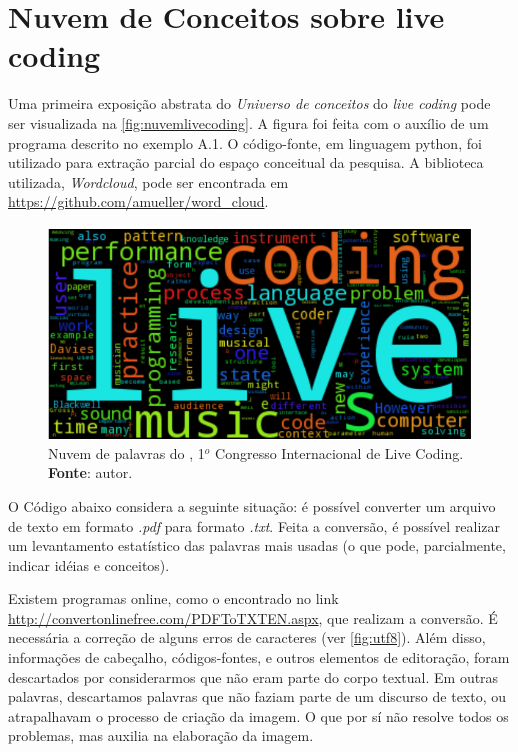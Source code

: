 \chapter{Nuvem de Conceitos sobre live coding}\label{app:A}

Uma primeira exposição abstrata do \emph{Universo de conceitos} do \emph{live coding} pode ser visualizada na \autoref{fig:nuvemlivecoding}. A figura foi feita com o auxílio de um programa descrito no exemplo A.1. O código-fonte, em linguagem python, foi utilizado para extração parcial do espaço conceitual da pesquisa. A biblioteca utilizada, \emph{Wordcloud}, pode ser encontrada em \url{https://github.com/amueller/word_cloud}. 

\begin{figure}[!h]\label{fig:nuvemlivecoding}
\begin{center}
\centering
\includegraphics[scale=0.8]{imagens/nuvem.png}
\caption{Nuvem de palavras do ,  1$^o$ Congresso Internacional de Live Coding. \textbf{Fonte}: autor.}
\end{center}
\end{figure}

O Código abaixo considera a seguinte situação: é possível converter um arquivo de texto em formato \emph{.pdf} para formato \emph{.txt}. Feita a conversão, é possível realizar um levantamento estatístico das palavras mais usadas (o que pode, parcialmente, indicar idéias e conceitos).

 Existem programas online, como o encontrado no link \url{http://convertonlinefree.com/PDFToTXTEN.aspx}, que realizam a conversão. É necessária a correção de alguns erros de caracteres (ver \autoref{fig:utf8}). Além disso, informações de cabeçalho, códigos-fontes, e outros elementos de editoração, foram descartados por considerarmos que não eram parte do corpo textual. Em outras palavras, descartamos palavras que não faziam parte de um discurso de texto, ou atrapalhavam o processo de criação da imagem. O que por sí não resolve todos os problemas, mas auxilia na elaboração da imagem.

